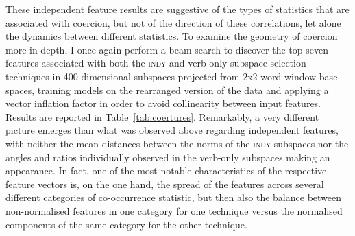 These independent feature results are suggestive of the types of statistics that are associated with coercion, but not of the direction of these correlations, let alone the dynamics between different statistics.  To examine the geometry of coercion more in depth, I once again perform a beam search to discover the top seven features associated with both the \textsc{indy} and verb-only subspace selection techniques in 400 dimensional subspaces projected from 2x2 word window base spaces, training models on the rearranged version of the data and applying a vector inflation factor in order to avoid collinearity between input features.  Results are reported in Table~\ref{tab:coertures}.  Remarkably, a very different picture emerges than what was observed above regarding independent features, with neither the mean distances between the norms of the \textsc{indy} subspaces nor the angles and ratios individually observed in the verb-only subspaces making an appearance.  In fact, one of the most notable characteristics of the respective feature vectors is, on the one hand, the spread of the features across several different categories of co-occurrence statistic, but then also the balance between non-normalised features in one category for one technique versus the normalised components of the same category for the other technique.

